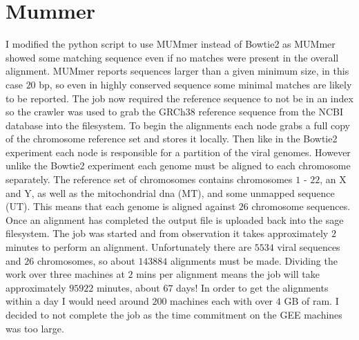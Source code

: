 

\section{Mummer}

I modified the python script to use MUMmer instead of Bowtie2 as MUMmer showed some matching sequence even if no matches were present in the overall alignment. MUMmer reports sequences larger than a given minimum size, in this case $20$ bp, so even in highly conserved sequence some minimal matches are likely to be reported. The job now required the reference sequence to not be in an index so the crawler was used to grab the GRCh38 reference sequence from the NCBI database into the filesystem. To begin the alignments each node grabs a full copy of the chromosome reference set and stores it locally. Then like in the Bowtie2 experiment each node is responsible for a partition of the viral genomes. However unlike the Bowtie2 experiment each genome must be aligned to each chromosome separately. The reference set of chromosomes contains chromosomes $1$ - $22$, an X and Y, as well as the mitochondrial dna (MT), and some unmapped sequence (UT). This means that each genome is aligned against $26$ chromosome sequences. Once an alignment has completed the output file is uploaded back into the sage filesystem. The job was started and from observation it takes approximately $2$ minutes to perform an alignment. Unfortunately there are $5534$ viral sequences and $26$ chromosomes, so about $143884$ alignments must be made. Dividing the work over three machines at $2$ mins per alignment means the job will take approximately $95922$ minutes, about $67$ days! In order to get the alignments within a day I would need around $200$ machines each with over $4$ GB of ram. I decided to not complete the job as the time commitment on the GEE machines was too large.